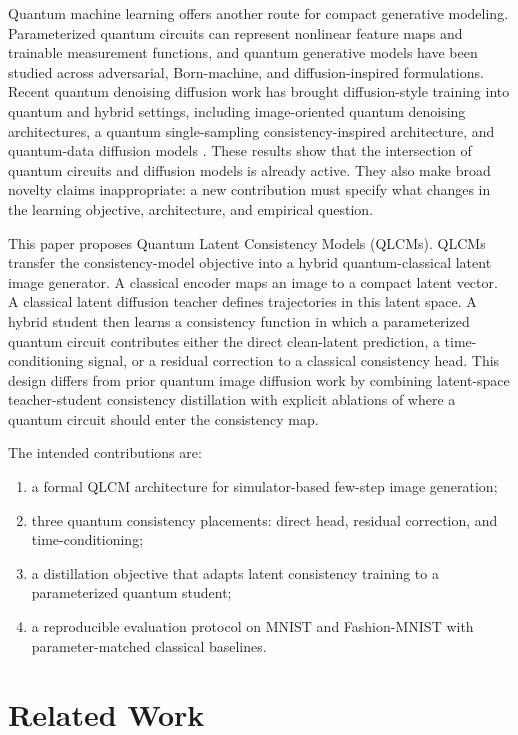 \documentclass[11pt]{article}
\begin{document}
Quantum machine learning offers another route for compact generative modeling.
Parameterized quantum circuits can represent nonlinear feature maps and
trainable measurement functions, and quantum generative models have been
studied across adversarial, Born-machine, and diffusion-inspired formulations.
Recent quantum denoising diffusion work has brought diffusion-style training
into quantum and hybrid settings, including image-oriented quantum denoising
architectures, a quantum single-sampling consistency-inspired architecture, and
quantum-data diffusion models
\citep{kolle2024qddm,zhang2023quddpm,kwun2024mixedquddpm}. These results show
that the intersection of quantum circuits and diffusion models is already
active. They also make broad novelty claims inappropriate: a new contribution
must specify what changes in the learning objective, architecture, and empirical
question.

This paper proposes Quantum Latent Consistency Models (QLCMs). QLCMs transfer
the consistency-model objective into a hybrid quantum-classical latent image
generator. A classical encoder maps an image to a compact latent vector. A
classical latent diffusion teacher defines trajectories in this latent space. A
hybrid student then learns a consistency function in which a parameterized
quantum circuit contributes either the direct clean-latent prediction, a
time-conditioning signal, or a residual correction to a classical consistency
head. This design differs from prior quantum image diffusion work by combining
latent-space teacher-student consistency distillation with explicit ablations of
where a quantum circuit should enter the consistency map.

The intended contributions are:
\begin{enumerate}
    \item a formal QLCM architecture for simulator-based few-step image
    generation;
    \item three quantum consistency placements: direct head, residual
    correction, and time-conditioning;
    \item a distillation objective that adapts latent consistency training to a
    parameterized quantum student;
    \item a reproducible evaluation protocol on MNIST and Fashion-MNIST with
    parameter-matched classical baselines.
\end{enumerate}

\section{Related Work}
\end{document}

